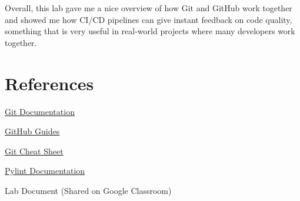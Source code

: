 \documentclass[10pt,a4paper]{report}
\begin{document}
Overall, this lab gave me a nice overview of how Git and GitHub work together and showed me how CI/CD pipelines can give instant feedback on code quality, something that is very useful in real-world projects where many developers work together.




\section{References}
\begin{enumerate}[label={[\arabic*]}, itemsep=0.05em, topsep=0pt]
    \item \href{https://git-scm.com/doc}{Git Documentation}
    \item \href{https://docs.github.com/en}{GitHub Guides}
    \item \href{https://education.github.com/git-cheat-sheet-education.pdf}{Git Cheat Sheet}
    \item \href{https://docs.pylint.org/}{Pylint Documentation}
    \item Lab Document (Shared on Google Classroom)
\end{enumerate}
\end{document}
